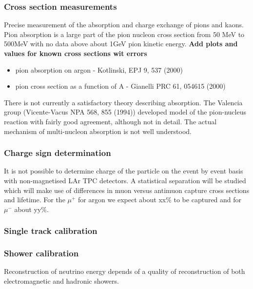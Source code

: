 \subsubsection{Cross section measurements}
Precise measurement of the  absorption and charge exchange of pions and kaons. Pion absorption is a large part of the pion nucleon cross section from 50 MeV to 500MeV with no data above about 1GeV pion kinetic energy. 
{\bf Add plots and values for known cross sections wit errors} 
\begin{itemize}
\item pion absorption on argon - Kotlinski, EPJ 9, 537 (2000)
\item pion cross section as a function of A - Gianelli PRC 61, 054615 (2000)
\end{itemize}
There is not currently a satisfactory theory describing absorption. The Valencia group (Vicente-Vacus NPA 568, 855 (1994)) developed model of    the pion-nucleus reaction with fairly good agreement, although not in detail. The actual  mechanism of multi-nucleon absorption
 is not well understood. 
 
\subsubsection{Charge sign determination}
It is not possible to determine charge of the particle on the event by event basis with non-magnetised LAr TPC detectors. A statistical separation will be studied which will make use of differences in muon versus antimuon capture cross sections and lifetime.
For the $\mu^+$ for argon we expect about xx\% to be captured and for $\mu^-$ about yy\%. 

\subsubsection{Single track calibration}

\subsubsection{Shower calibration}

Reconstruction of neutrino energy depends of a quality of reconstruction of both electromagnetic and hadronic showers. 

